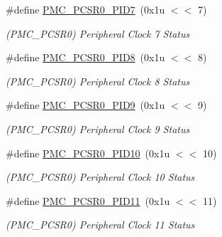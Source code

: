 \begin{DoxyCompactItemize}
\mbox{\label{group__SAME70__PMC_gaf0489b06cf0cb06ef115099fdf56fc3e}} 
\#define \mbox{\hyperlink{group__SAME70__PMC_gaf0489b06cf0cb06ef115099fdf56fc3e}{P\+M\+C\+\_\+\+P\+C\+S\+R0\+\_\+\+P\+I\+D7}}~(0x1u $<$$<$ 7)
\begin{DoxyCompactList}\small\item\em (P\+M\+C\+\_\+\+P\+C\+S\+R0) Peripheral Clock 7 Status \end{DoxyCompactList}\item 
\mbox{\label{group__SAME70__PMC_gaaa314397c89a5ab032c464267b2d99ed}} 
\#define \mbox{\hyperlink{group__SAME70__PMC_gaaa314397c89a5ab032c464267b2d99ed}{P\+M\+C\+\_\+\+P\+C\+S\+R0\+\_\+\+P\+I\+D8}}~(0x1u $<$$<$ 8)
\begin{DoxyCompactList}\small\item\em (P\+M\+C\+\_\+\+P\+C\+S\+R0) Peripheral Clock 8 Status \end{DoxyCompactList}\item 
\mbox{\label{group__SAME70__PMC_ga2211d038ad027c64e82e69ff1ee493b1}} 
\#define \mbox{\hyperlink{group__SAME70__PMC_ga2211d038ad027c64e82e69ff1ee493b1}{P\+M\+C\+\_\+\+P\+C\+S\+R0\+\_\+\+P\+I\+D9}}~(0x1u $<$$<$ 9)
\begin{DoxyCompactList}\small\item\em (P\+M\+C\+\_\+\+P\+C\+S\+R0) Peripheral Clock 9 Status \end{DoxyCompactList}\item 
\mbox{\label{group__SAME70__PMC_gae545f7dc0353b4cf88af68fa9485ef68}} 
\#define \mbox{\hyperlink{group__SAME70__PMC_gae545f7dc0353b4cf88af68fa9485ef68}{P\+M\+C\+\_\+\+P\+C\+S\+R0\+\_\+\+P\+I\+D10}}~(0x1u $<$$<$ 10)
\begin{DoxyCompactList}\small\item\em (P\+M\+C\+\_\+\+P\+C\+S\+R0) Peripheral Clock 10 Status \end{DoxyCompactList}\item 
\mbox{\label{group__SAME70__PMC_ga50a5281db7e153aba3eb684fa9ed8c08}} 
\#define \mbox{\hyperlink{group__SAME70__PMC_ga50a5281db7e153aba3eb684fa9ed8c08}{P\+M\+C\+\_\+\+P\+C\+S\+R0\+\_\+\+P\+I\+D11}}~(0x1u $<$$<$ 11)
\begin{DoxyCompactList}\small\item\em (P\+M\+C\+\_\+\+P\+C\+S\+R0) Peripheral Clock 11 Status \end{DoxyCompactList}\item 
$$
\end{DoxyCompactItemize}
